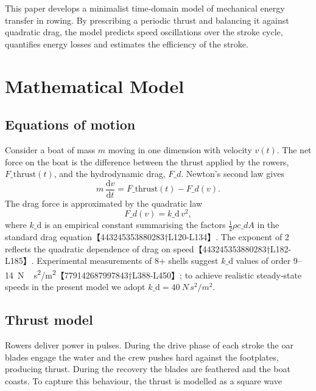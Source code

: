 \documentclass[11pt]{article}
\begin{document}
This paper develops a minimalist time‑domain model of mechanical energy
transfer in rowing.  By prescribing a periodic thrust and balancing it
against quadratic drag, the model predicts speed oscillations over the stroke
cycle, quantifies energy losses and estimates the efficiency of the stroke.

\section{Mathematical Model}

\subsection{Equations of motion}

Consider a boat of mass \(m\) moving in one dimension with velocity
\(v(t)\).  The net force on the boat is the difference between the thrust
applied by the rowers, \(F\_{\text{thrust}}(t)\), and the hydrodynamic
drag, \(F\_d\).  Newton’s second law gives
\begin{equation}
  m\,\frac{\mathrm{d}v}{\mathrm{d}t} = F\_{\text{thrust}}(t) - F\_d(v).
  \label{eq:newton}
\end{equation}
The drag force is approximated by the quadratic law
\begin{equation}
  F\_d(v) = k\_\mathrm{d} \, v^2,
  \label{eq:drag}
\end{equation}
where \(k\_\mathrm{d}\) is an empirical constant summarising the factors
\(\tfrac{1}{2}\rho c\_d A\) in the standard drag equation【443245353880283†L120-L134】.  The exponent of 2 reflects the quadratic
dependence of drag on speed【443245353880283†L182-L185】.  Experimental
measurements of 8+ shells suggest \(k\_\mathrm{d}\) values of order
\numrange{9}{14} \si{N\,s^2/m^2}【779142687997843†L388-L450】; to achieve
realistic steady‑state speeds in the present model we adopt
\(k\_\mathrm{d}=\SI{40}{N\,s^2/m^2}\).

\subsection{Thrust model}

Rowers deliver power in pulses.  During the drive phase of each stroke the
oar blades engage the water and the crew pushes hard against the footplates,
producing thrust.  During the recovery the blades are feathered and the boat
coasts.  To capture this behaviour, the thrust is modelled as a square wave
\end{document}
